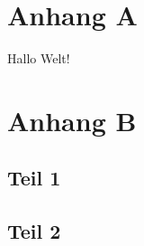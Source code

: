 
\appendix


%  
%
%


\chapter{Anhang A}

Hallo Welt!

\chapter{Anhang B}
\section{Teil 1}

\section{Teil 2}
